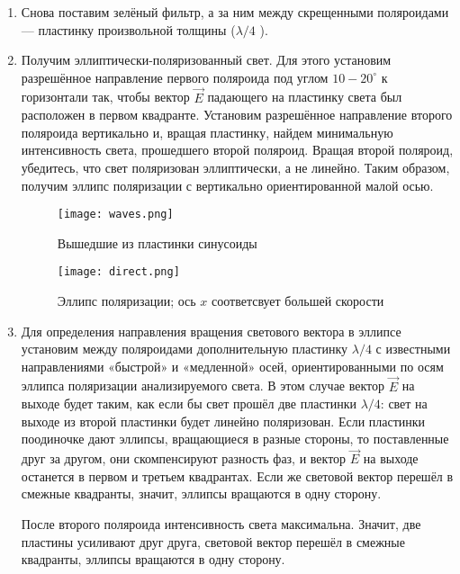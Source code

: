 \documentclass[12pt,a4paper]{article}
\begin{document}
\begin{enumerate}
    \item  Снова поставим зелёный фильтр,
а за ним между скрещенными поляроидами
— пластинку произвольной толщины ($\lambda/4$ ).
\item Получим эллиптически-поляризованный свет. Для этого установим разрешённое направление первого поляроида под углом $10 - 20^\circ$ к горизонтали так, чтобы вектор $\vec{E}$ падающего на пластинку света был расположен в первом квадранте.
Установим разрешённое направление второго поляроида вертикально и, вращая пластинку, найдем минимальную
интенсивность света, прошедшего второй поляроид. Вращая второй поляроид, убедитесь, что свет поляризован эллиптически,
а не линейно.
Таким образом, получим эллипс поляризации с вертикально ориентированной малой осью.

\begin{figure}[h]
\begin{center}
\begin{minipage}[h]{0.4\linewidth}
\texttt{[image: waves.png]}
\caption{Вышедшие из пластинки синусоиды} %
\label{waves} %
\end{minipage}
\hfill 
\begin{minipage}[h]{0.4\linewidth}
\texttt{[image: direct.png]}
\caption{Эллипс поляризации; ось $x$ соответсвует большей скорости}
\label{direct}
\end{minipage}
\end{center}
\end{figure}

\item  Для определения направления вращения светового вектора в эллипсе
установим между поляроидами дополнительную пластинку $\lambda/4$ с известными направлениями «быстрой» и «медленной» осей, ориентированными по осям эллипса поляризации анализируемого света.
В этом случае вектор $\vec{E}$ на выходе будет таким, как если бы свет прошёл две
пластинки $\lambda/4$: свет на выходе из второй пластинки будет линейно поляризован. Если пластинки поодиночке дают эллипсы, вращающиеся в разные стороны, то поставленные друг за другом, они скомпенсируют
разность фаз, и вектор $\vec{E}$ на выходе останется в первом
и третьем квадрантах. Если
же световой вектор перешёл в смежные квадранты, значит, эллипсы вращаются в одну сторону. 
\par После второго поляроида интенсивность света максимальна. Значит, две пластины усиливают друг друга, световой вектор перешёл в смежные квадранты, эллипсы вращаются в одну сторону.

\end{enumerate}
\end{document}
